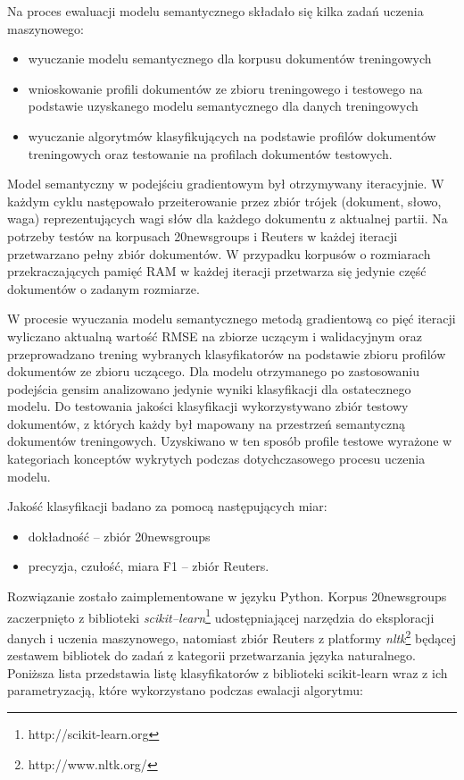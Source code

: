 \documentclass{pracamgr}
\begin{document}
Na proces ewaluacji modelu semantycznego składało się kilka zadań uczenia maszynowego:
\begin{itemize}
    \item wyuczanie modelu semantycznego dla korpusu dokumentów treningowych
    \item wnioskowanie profili dokumentów ze zbioru treningowego i testowego na podstawie uzyskanego modelu semantycznego dla danych treningowych
    \item wyuczanie algorytmów klasyfikujących na podstawie profilów dokumentów treningowych oraz testowanie na profilach dokumentów testowych.
\end{itemize}

Model semantyczny w podejściu gradientowym był otrzymywany iteracyjnie. W każdym cyklu następowało przeiterowanie przez zbiór trójek (dokument, słowo, waga) reprezentujących wagi słów dla każdego dokumentu z aktualnej partii. Na potrzeby testów na korpusach 20newsgroups i Reuters w każdej iteracji przetwarzano pełny zbiór dokumentów. W przypadku korpusów o rozmiarach przekraczających pamięć RAM w każdej iteracji przetwarza się jedynie część dokumentów o zadanym rozmiarze.

W procesie wyuczania modelu semantycznego metodą gradientową co pięć iteracji wyliczano aktualną wartość RMSE na zbiorze uczącym i walidacyjnym oraz przeprowadzano trening wybranych klasyfikatorów na podstawie zbioru profilów dokumentów ze zbioru uczącego. Dla modelu otrzymanego po zastosowaniu podejścia gensim analizowano jedynie wyniki klasyfikacji dla ostatecznego modelu. Do testowania jakości klasyfikacji wykorzystywano zbiór testowy dokumentów, z których każdy był mapowany na przestrzeń semantyczną dokumentów treningowych. Uzyskiwano w ten sposób profile testowe wyrażone w kategoriach konceptów wykrytych podczas dotychczasowego procesu uczenia modelu.

Jakość klasyfikacji badano za pomocą następujących miar:

\begin{itemize}
    \item dokładność -- zbiór 20newsgroups
    \item precyzja, czułość, miara F1 -- zbiór Reuters.
\end{itemize}

Rozwiązanie zostało zaimplementowane w języku Python. Korpus 20newsgroups zaczerpnięto z biblioteki \textit{scikit--learn}\footnote{http://scikit-learn.org} udostępniającej narzędzia do eksploracji danych i uczenia maszynowego, natomiast zbiór Reuters z platformy \textit{nltk}\footnote{http://www.nltk.org/} będącej zestawem bibliotek do zadań z kategorii przetwarzania języka naturalnego. Poniższa lista przedstawia listę klasyfikatorów z biblioteki scikit-learn wraz z ich parametryzacją, które wykorzystano podczas ewalacji algorytmu:
\end{document}
